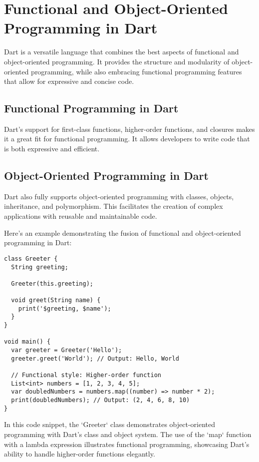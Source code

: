 \documentclass{book}
\begin{document}
\chapter{Functional and Object-Oriented Programming in Dart}

Dart is a versatile language that combines the best aspects of functional and object-oriented programming. It provides the structure and modularity of object-oriented programming, while also embracing functional programming features that allow for expressive and concise code.

\section{Functional Programming in Dart}
Dart's support for first-class functions, higher-order functions, and closures makes it a great fit for functional programming. It allows developers to write code that is both expressive and efficient.

\section{Object-Oriented Programming in Dart}
Dart also fully supports object-oriented programming with classes, objects, inheritance, and polymorphism. This facilitates the creation of complex applications with reusable and maintainable code.

Here's an example demonstrating the fusion of functional and object-oriented programming in Dart:

\begin{lstlisting}[style=dartstyle]
class Greeter {
  String greeting;

  Greeter(this.greeting);

  void greet(String name) {
    print('$greeting, $name');
  }
}

void main() {
  var greeter = Greeter('Hello');
  greeter.greet('World'); // Output: Hello, World

  // Functional style: Higher-order function
  List<int> numbers = [1, 2, 3, 4, 5];
  var doubledNumbers = numbers.map((number) => number * 2);
  print(doubledNumbers); // Output: (2, 4, 6, 8, 10)
}
\end{lstlisting}

In this code snippet, the `Greeter` class demonstrates object-oriented programming with Dart's class and object system. The use of the `map` function with a lambda expression illustrates functional programming, showcasing Dart's ability to handle higher-order functions elegantly.
\end{document}

